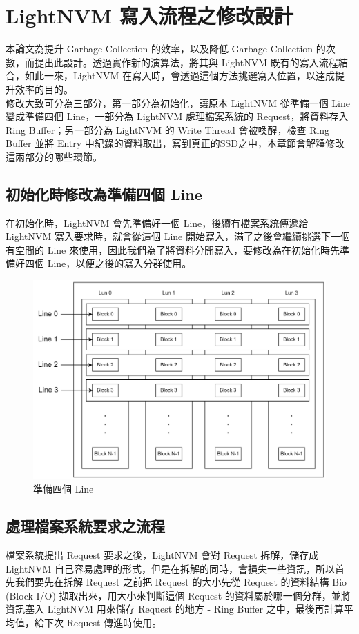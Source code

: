 \chapter{LightNVM 寫入流程之修改設計}
\indent
本論文為提升 Garbage Collection 的效率，以及降低 Garbage Collection 的次數，而提出此設計。透過實作新的演算法，將其與 LightNVM 既有的寫入流程結合，如此一來，LightNVM 在寫入時，會透過這個方法挑選寫入位置，以達成提升效率的目的。\\
\indent
修改大致可分為三部分，第一部分為初始化，讓原本 LightNVM 從準備一個 Line 變成準備四個 Line，一部分為 LightNVM 處理檔案系統的 Request，將資料存入 Ring Buffer；另一部分為 LightNVM 的 Write Thread 會被喚醒，檢查 Ring Buffer 並將 Entry 中紀錄的資料取出，寫到真正的SSD之中，本章節會解釋修改這兩部分的哪些環節。

\section{初始化時修改為準備四個 Line}\label{s3.1}
\indent
在初始化時，LightNVM 會先準備好一個 Line，後續有檔案系統傳遞給 LightNVM 寫入要求時，就會從這個 Line 開始寫入，滿了之後會繼續挑選下一個有空間的 Line 來使用，因此我們為了將資料分開寫入，要修改為在初始化時先準備好四個 Line，以便之後的寫入分群使用。

\begin{figure}[H]
    \centering
    \includegraphics[width=1\textwidth]{picture/ch3/4Line.png}
    \caption{準備四個 Line}
    \label{f3.1}
\end{figure}

\section{處理檔案系統要求之流程}\label{s3.2}
\indent
檔案系統提出 Request 要求之後，LightNVM 會對 Request 拆解，儲存成 LightNVM 自己容易處理的形式，但是在拆解的同時，會損失一些資訊，所以首先我們要先在拆解 Request 之前把 Request 的大小先從 Request 的資料結構 Bio (Block I/O) \cite{10.1145/2619092}擷取出來，用大小來判斷這個 Request 的資料屬於哪一個分群，並將資訊塞入 LightNVM 用來儲存 Request 的地方 - Ring Buffer 之中，最後再計算平均值，給下次 Request 傳進時使用。\cite{LightNVM}
\newpage

